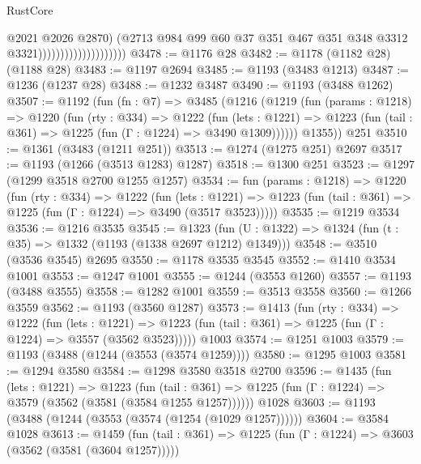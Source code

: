 \begin{lexlean}{RustCore}
\begin{coremodule}
                                            @2021
                                            @2026
                                            @2870)
                                          (@2713
                                            @984
                                            @99
                                            @60
                                            @37
                                            @351
                                            @467
                                            @351
                                            @348
                                            @3312
                                            @3321))))))))))))))))))))
@3478 := @1176 @28
@3482 := @1178 (@1182 @28) (@1188 @28)
@3483 := @1197 @2694
@3485 := @1193 (@3483 @1213)
@3487 := @1236 (@1237 @28)
@3488 := @1232 @3487
@3490 := @1193 (@3488 @1262)
@3507 := @1192
    (fun (fn : @7) =>
    @3485
      (@1216
        (@1219
          (fun (params : @1218) =>
          @1220
            (fun (rty : @334) =>
            @1222
              (fun (lets : @1221) =>
              @1223 (fun (tail : @361) => @1225 (fun (Γ : @1224) => @3490 @1309))))))
        @1355))
    @251
@3510 := @1361 (@3483 (@1211 @251))
@3513 := @1274 (@1275 @251) @2697
@3517 := @1193 (@1266 (@3513 @1283) @1287)
@3518 := @1300 @251
@3523 := @1297 (@1299 @3518 @2700 @1255 @1257)
@3534 := fun (params : @1218) =>
  @1220
    (fun (rty : @334) =>
    @1222
      (fun (lets : @1221) =>
      @1223 (fun (tail : @361) => @1225 (fun (Γ : @1224) => @3490 (@3517 @3523)))))
@3535 := @1219 @3534
@3536 := @1216 @3535
@3545 := @1323 (fun (U : @1322) => @1324 (fun (t : @35) => @1332 (@1193 (@1338 @2697 @1212) @1349)))
@3548 := @3510 (@3536 @3545) @2695
@3550 := @1178 @3535 @3545
@3552 := @1410 @3534 @1001
@3553 := @1247 @1001
@3555 := @1244 (@3553 @1260)
@3557 := @1193 (@3488 @3555)
@3558 := @1282 @1001
@3559 := @3513 @3558
@3560 := @1266 @3559
@3562 := @1193 (@3560 @1287)
@3573 := @1413
    (fun (rty : @334) =>
    @1222
      (fun (lets : @1221) =>
      @1223 (fun (tail : @361) => @1225 (fun (Γ : @1224) => @3557 (@3562 @3523)))))
    @1003
@3574 := @1251 @1003
@3579 := @1193 (@3488 (@1244 (@3553 (@3574 @1259))))
@3580 := @1295 @1003
@3581 := @1294 @3580
@3584 := @1298 @3580 @3518 @2700
@3596 := @1435
    (fun (lets : @1221) =>
    @1223
      (fun (tail : @361) => @1225 (fun (Γ : @1224) => @3579 (@3562 (@3581 (@3584 @1255 @1257))))))
    @1028
@3603 := @1193 (@3488 (@1244 (@3553 (@3574 (@1254 (@1029 @1257))))))
@3604 := @3584 @1028
@3613 := @1459
    (fun (tail : @361) => @1225 (fun (Γ : @1224) => @3603 (@3562 (@3581 (@3604 @1257)))))

\end{coremodule}
\end{lexlean}
